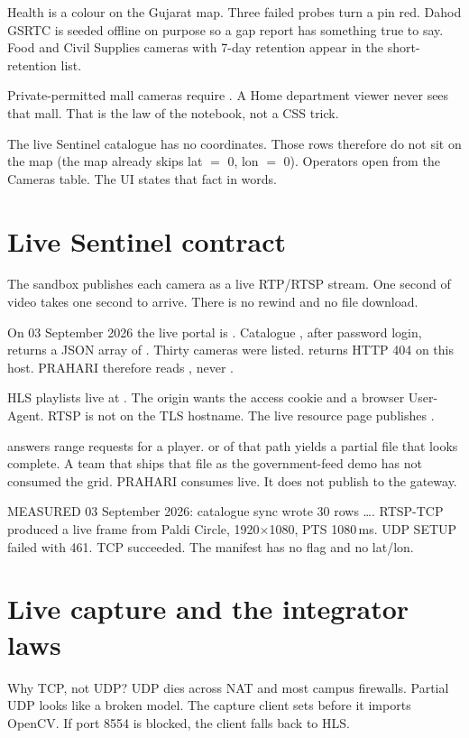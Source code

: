 \documentclass[listings]{csf301-notes}
\begin{document}
Health is a colour on the Gujarat map. Three failed probes turn a pin red. Dahod GSRTC is seeded offline on purpose so a gap report has something true to say. Food and Civil Supplies cameras with 7-day retention appear in the short-retention list.

Private-permitted mall cameras require . A Home department viewer never sees that mall. That is the law of the notebook, not a CSS trick.

The live Sentinel catalogue has no coordinates. Those rows therefore do not sit on the map (the map already skips lat $=$ 0, lon $=$ 0). Operators open  from the Cameras table. The UI states that fact in words.

\section{Live Sentinel contract}
The sandbox publishes each camera as a live RTP/RTSP stream. One second of video takes one second to arrive. There is no rewind and no file download.

On 03 September 2026 the live portal is . Catalogue , after password login, returns a JSON array of . Thirty cameras were listed.  returns HTTP 404 on this host. PRAHARI therefore reads , never .

HLS playlists live at . The origin wants the access cookie and a browser User-Agent. RTSP is not on the TLS hostname. The live resource page publishes .

\begin{warning}
 answers range requests for a player.  or  of that path yields a partial file that looks complete. A team that ships that file as the government-feed demo has not consumed the grid. PRAHARI consumes live. It does not publish to the gateway.
\end{warning}

MEASURED 03 September 2026: catalogue sync wrote 30 rows  \ldots {}. RTSP-TCP produced a live frame from  Paldi Circle, 1920$\times$1080, PTS 1080\,ms. UDP SETUP failed with 461. TCP succeeded. The manifest has no  flag and no lat/lon.

\section{Live capture and the integrator laws}
Why TCP, not UDP? UDP dies across NAT and most campus firewalls. Partial UDP looks like a broken model. The capture client sets  before it imports OpenCV. If port 8554 is blocked, the client falls back to HLS.
\end{document}
